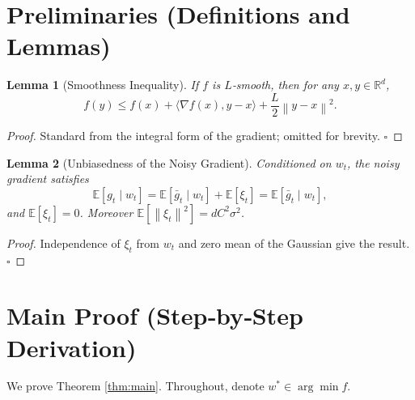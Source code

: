 \documentclass[11pt]{article}
\newtheorem{lemma}{Lemma}
\newcommand{\E}{\mathbb{E}}
\newcommand{\R}{\mathbb{R}}
\newcommand{\norm}[1]{\left\lVert#1\right\rVert}
\newcommand{\ip}[2]{\langle #1,#2\rangle}
\newcommand{\grad}{\nabla}
\begin{document}
\section*{Preliminaries (Definitions and Lemmas)}
\begin{lemma}[Smoothness Inequality]\label{lem:smooth}
If $f$ is $L$‑smooth, then for any $x,y\in\R^{d}$,
\[
f(y)\le f(x)+\ip{\grad f(x)}{y-x}+\frac{L}{2}\norm{y-x}^{2}.
\]
\end{lemma}
\begin{proof}
Standard from the integral form of the gradient; omitted for brevity. \hfill $\square$
\end{proof}
\begin{lemma}[Unbiasedness of the Noisy Gradient]\label{lem:unbiased}
Conditioned on $w_t$, the noisy gradient satisfies
\[
\E[g_t\mid w_t]=\E[\bar g_t\mid w_t]+\E[\xi_t]=\E[\bar g_t\mid w_t],
\]
and $\E[\xi_t]=0$. Moreover $\E[\norm{\xi_t}^{2}]=dC^{2}\sigma^{2}$.
\end{lemma}
\begin{proof}
Independence of $\xi_t$ from $w_t$ and zero mean of the Gaussian give the result. \hfill $\square$
\end{proof}

\section*{Main Proof (Step‑by‑Step Derivation)}
We prove Theorem \ref{thm:main}. Throughout, denote $w^{*}\in\arg\min f$.
\end{document}
